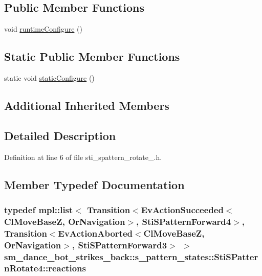 \subsection*{Public Member Functions}
\begin{DoxyCompactItemize}
\item 
void \hyperlink{structsm__dance__bot__strikes__back_1_1s__pattern__states_1_1StiSPatternRotate4_a3c194d4342eb3906d96697a88857f9bd}{runtime\+Configure} ()
\end{DoxyCompactItemize}
\subsection*{Static Public Member Functions}
\begin{DoxyCompactItemize}
\item 
static void \hyperlink{structsm__dance__bot__strikes__back_1_1s__pattern__states_1_1StiSPatternRotate4_a449cad0fd02e6891836bce924daaef1f}{static\+Configure} ()
\end{DoxyCompactItemize}
\subsection*{Additional Inherited Members}


\subsection{Detailed Description}


Definition at line 6 of file sti\+\_\+spattern\+\_\+rotate\+\_.\+h.



\subsection{Member Typedef Documentation}
\subsubsection[{\texorpdfstring{reactions}{reactions}}]{\setlength{\rightskip}{0pt plus 5cm}typedef mpl\+::list$<$ Transition$<$Ev\+Action\+Succeeded$<${\bf Cl\+Move\+BaseZ}, {\bf Or\+Navigation}$>$, {\bf Sti\+S\+Pattern\+Forward4}$>$, Transition$<$Ev\+Action\+Aborted$<${\bf Cl\+Move\+BaseZ}, {\bf Or\+Navigation}$>$, {\bf Sti\+S\+Pattern\+Forward3}$>$ $>$ {\bf sm\+\_\+dance\+\_\+bot\+\_\+strikes\+\_\+back\+::s\+\_\+pattern\+\_\+states\+::\+Sti\+S\+Pattern\+Rotate4\+::reactions}}\hypertarget{structsm__dance__bot__strikes__back_1_1s__pattern__states_1_1StiSPatternRotate4_a8e931a92d216e81b8343aa94a6b5aa23}{}\label{structsm__dance__bot__strikes__back_1_1s__pattern__states_1_1StiSPatternRotate4_a8e931a92d216e81b8343aa94a6b5aa23}


